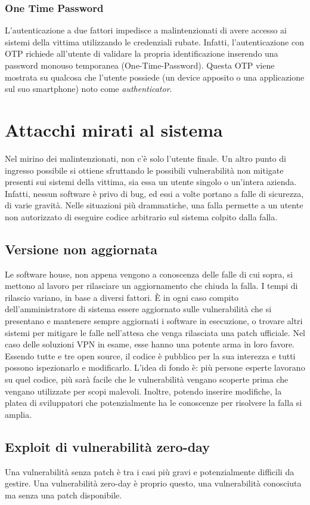 \subsubsection{One Time Password}
L'autenticazione a due fattori impedisce a malintenzionati di avere accesso ai sistemi della vittima utilizzando le credenziali rubate. Infatti, l'autenticazione con OTP richiede all'utente di validare la propria identificazione inserendo una password monouso temporanea (One-Time-Password).
Questa OTP viene mostrata su qualcosa che l'utente possiede (un device apposito o una applicazione sul suo smartphone) noto come \emph{authenticator}.


\section{Attacchi mirati al sistema}
Nel mirino dei malintenzionati, non c'è solo l'utente finale. Un altro punto di ingresso possibile si ottiene sfruttando le possibili vulnerabilità non mitigate presenti sui sistemi della vittima, sia essa un utente singolo o un'intera azienda.
Infatti, nessun software è privo di bug, ed essi a volte portano a falle di sicurezza, di varie gravità. Nelle situazioni più drammatiche, una falla permette a un utente non autorizzato di eseguire codice arbitrario sul sistema colpito dalla falla.

\subsection{Versione non aggiornata}
Le software house, non appena vengono a conoscenza delle falle di cui sopra, si mettono al lavoro per rilasciare un aggiornamento che chiuda la falla.
I tempi di rilascio variano, in base a diversi fattori. È in ogni caso compito dell'amministratore di sistema essere aggiornato sulle vulnerabilità che si presentano e mantenere sempre aggiornati i software in esecuzione, o trovare altri sistemi per mitigare le falle nell'attesa che venga rilasciata una patch ufficiale.
Nel caso delle soluzioni VPN in esame, esse hanno una potente arma in loro favore.
Essendo tutte e tre open source, il codice è pubblico per la sua interezza e tutti possono ispezionarlo e modificarlo.
L'idea di fondo è: più persone esperte lavorano su quel codice, più sarà facile che le vulnerabilità vengano scoperte prima che vengano utilizzate per scopi malevoli.
Inoltre, potendo inserire modifiche, la platea di sviluppatori che potenzialmente ha le conoscenze per risolvere la falla si amplia.

\subsection{Exploit di vulnerabilità zero-day}
Una vulnerabilità senza patch è tra i casi più gravi e potenzialmente difficili da gestire. Una vulnerabilità zero-day è proprio questo, una vulnerabilità conosciuta ma senza una patch disponibile.




